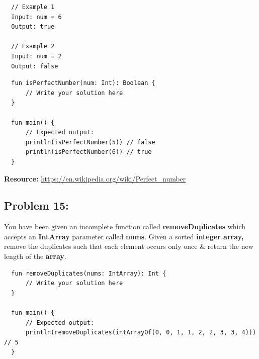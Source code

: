 \documentclass{article}
\begin{document}
\begin{verbatim}
  // Example 1
  Input: num = 6
  Output: true

  // Example 2
  Input: num = 2
  Output: false
\end{verbatim}

\begin{verbatim}
  fun isPerfectNumber(num: Int): Boolean {
      // Write your solution here
  }

  fun main() {
      // Expected output:
      println(isPerfectNumber(5)) // false
      println(isPerfectNumber(6)) // true
  }
\end{verbatim}

\textbf{Resource:} \href{https://en.wikipedia.org/wiki/Perfect_number}{https://en.wikipedia.org/wiki/Perfect\_number}

\subsection*{Problem 15:}
You have been given an incomplete function called \textbf{removeDuplicates} which accepts an \textbf{IntArray} parameter called \textbf{nums}. Given a sorted \textbf{integer array,} remove the duplicates such that each element occurs only once \& return the new length of the \textbf{array}.

\begin{verbatim}
  fun removeDuplicates(nums: IntArray): Int {
      // Write your solution here  
  }

  fun main() {
      // Expected output:
      println(removeDuplicates(intArrayOf(0, 0, 1, 1, 2, 2, 3, 3, 4))) // 5
  }
\end{verbatim}
\end{document}
